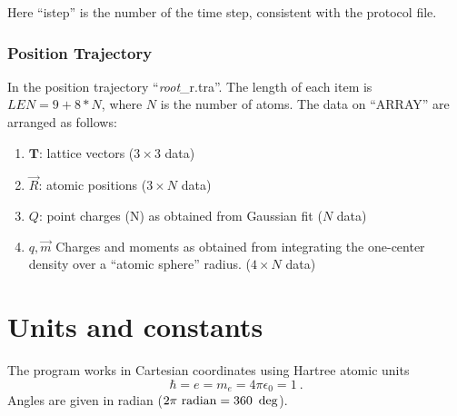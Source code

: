 \documentclass[final,12pt]{article}
\begin{document}
{{{{{{Here ``istep'' is the number of the time step, consistent with the
protocol file. 

\subsubsection{Position Trajectory}
In the position trajectory ``{\it root}\_r.tra''. The length of each
item is $LEN=9+8*N$, where $N$ is the number of atoms. The data on
``ARRAY'' are arranged as follows:
\begin{enumerate}
\item $\mathbf{T}$: lattice vectors ($3\times3$ data)
\item $\vec{R}$: atomic positions ($3\times N$ data)
\item $Q$: point charges (N) as obtained from Gaussian fit ($N$ data)
\item $q,\vec{m}$ Charges and moments as obtained from integrating the
  one-center density over a ``atomic sphere'' radius. ($4\times N$ data)
\end{enumerate}





\newpage
\section{Units and constants}
\label{constants}

The program works in Cartesian coordinates using Hartree atomic units
\begin{equation}
\hbar=e=m_e=4\pi\epsilon_0=1 \ .
\end{equation}
Angles are given in radian ($2\pi~{\rm radian}=360~\deg$).

}}}}}}
\end{document}
